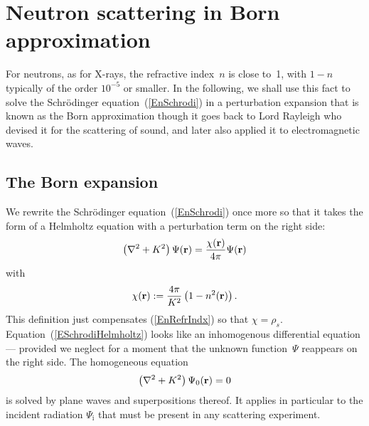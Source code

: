 
\section{Neutron scattering in Born approximation}

For neutrons, as for X-rays, the refractive index~$n$ is close to~1,
with $1-n$ typically of the order $10^{-5}$ or smaller.
In the following,
we shall use this fact to solve the Schrödinger equation~(\ref{EnSchrodi})
in a perturbation expansion
that is known as the Born approximation
though it goes back to Lord Rayleigh
who devised it for the scattering of sound,
and later also applied it to electromagnetic waves.

\subsection{The Born expansion}\label{SBorn}


We rewrite the Schrödinger equation~(\ref{EnSchrodi})
once more so that it takes the form of a Helmholtz equation
with a perturbation term on the right side:
\begin{equation}\label{ESchrodiHelmholtz}
  \left(\mathbf{\nabla}^2+K^2\right)\Psi(\mathbf{r})
  = \frac{\chi(\mathbf{r})}{4\pi}\Psi(\mathbf{r})
\end{equation}
with
\begin{equation}\label{EChiDef}
  \chi(\mathbf{r}) := \frac{4\pi}{K^2}\left(1-n^2(\mathbf{r})\right).
\end{equation}
This definition just compensates (\ref{EnRefrIndx}) so that $\chi=\rho_s$.
Equation~(\ref{ESchrodiHelmholtz}) looks
like an inhomogenous differential equation ---
provided we neglect for a moment that the unknown function~$\Psi$
reappears on the right side.
The homogeneous equation
\begin{equation}\label{EHelmholtzHomog}
  \left(\mathbf{\nabla}^2+K^2\right)\Psi_0(\mathbf{r}) = 0
\end{equation}
is solved by plane waves and superpositions thereof.
It applies in particular to the incident radiation
$\Psi_\text{i}$ that must be present in any scattering experiment.

